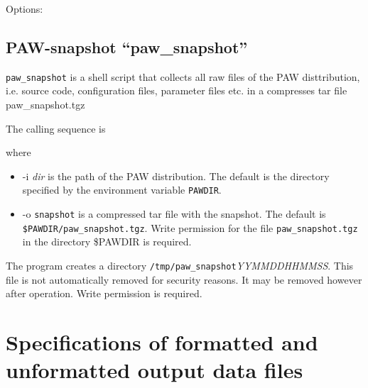 \documentclass[final,12pt]{article}
\begin{document}
{{{{{{\bigskip{}
\vspace{0.5cm}

\noindent Options:\\[2mm]
\hspace*{1cm}

\subsection{PAW-snapshot ``paw\_snapshot''}
{\tt paw\_snapshot} is a shell script that collects all raw files of
the PAW disttribution, i.e. source code, configuration files,
parameter files etc. in a compresses tar file paw\_snapshot.tgz

The calling sequence is

\bigskip{}
\bigskip

where 
\begin{itemize}
\item -i \textit{dir} is the path of the PAW distribution. The default
  is the directory specified by the environment variable
  \texttt{PAWDIR}.
\item -o \texttt{snapshot} is a compressed tar file with the
  snapshot. The default is \texttt{\$PAWDIR/paw\_snapshot.tgz}.  Write
  permission for the file \texttt{paw\_snapshot.tgz} in the directory
  \$PAWDIR is required.  
\end{itemize}
The program creates a directory
\texttt{/tmp/paw\_snapshot}\textit{YYMMDDHHMMSS}. This file is not
automatically removed for security reasons. It may be removed however
after operation. Write permission is required.


\newpage
\section{Specifications of formatted and unformatted output data files}
}}}}}}
\end{document}
